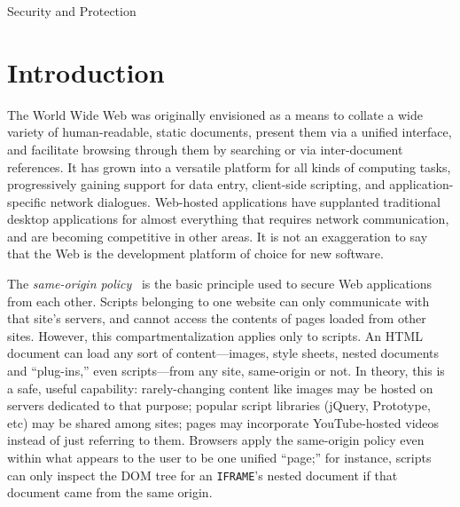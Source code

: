 \documentclass{acm_proc_article-sp}
\begin{document}
                {Security and Protection}



\section{Introduction}

The World Wide Web was originally envisioned \cite{wwwproposal} as a
means to collate a wide variety of human-readable, static documents,
present them via a unified interface, and facilitate browsing through
them by searching or via inter-document references. It has grown into
a versatile platform for all kinds of computing tasks, progressively
gaining support for data entry, client-side scripting, and
application-specific network dialogues.  Web-hosted applications have
supplanted traditional desktop applications for almost everything that
requires network communication, and are becoming competitive in other
areas.  It is not an exaggeration to say that the Web is the
development platform of choice for new software.

The \emph{same-origin policy}~\cite{mozillasameorigin} is the basic
principle used to secure Web applications from each other.  Scripts
belonging to one website can only communicate with that site's
servers, and cannot access the contents of pages loaded from other
sites.  However, this compartmentalization applies only to scripts.
An HTML document can load any sort of content---images, style sheets,
nested documents and “plug-ins,” even scripts---from any site,
same-origin or not.  In theory, this is a safe, useful capability:
rarely-changing content like images may be hosted on servers dedicated
to that purpose; popular script libraries (jQuery, Prototype, etc) may
be shared among sites; pages may incorporate YouTube-hosted videos
instead of just referring to them.  Browsers apply the same-origin
policy even within what appears to the user to be one unified “page;”
for instance, scripts can only inspect the DOM tree for an
\texttt{IFRAME}'s nested document if that document came from the same
origin.
\end{document}
